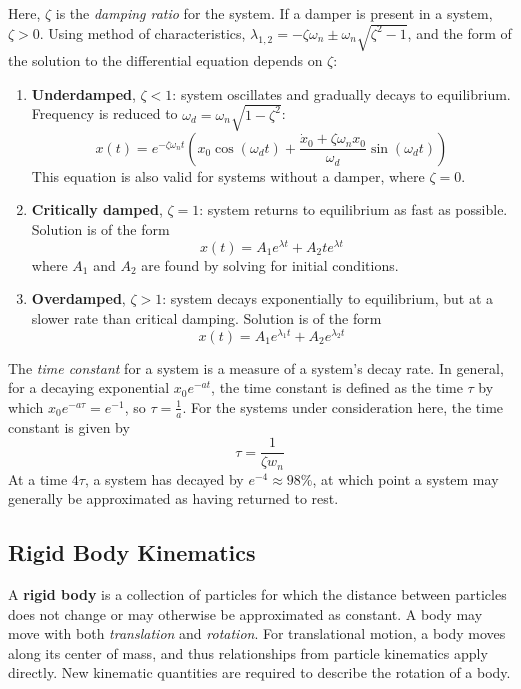 \newpage

Here, $\zeta$ is the \textit{damping ratio} for the system. If a damper is present in a system, $\zeta > 0$. Using method of characteristics, $\lambda_{1,2} = -\zeta\omega_n \pm \omega_n\sqrt{\zeta^2-1}$, and the form of the solution to the differential equation depends on $\zeta$:

\begin{enumerate}
    \item[] \textbf{Underdamped}, $\zeta < 1$: system oscillates and gradually decays to equilibrium. Frequency is reduced to $\omega_d = \omega_n \sqrt{1-\zeta^2}$: \[x(t) = e^{-\zeta\omega_nt}\left(x_0\cos(\omega_d t)+\frac{\dot x_0+\zeta\omega_nx_0}{\omega_d}\sin(\omega_d t)\right)\]
    This equation is also valid for systems without a damper, where $\zeta=0$.
    \item[] \textbf{Critically damped}, $\zeta = 1$: system returns to equilibrium as fast as possible. Solution is of the form \[x(t) = A_1e^{\lambda t} + A_2te^{\lambda t}\] where $A_1$ and $A_2$ are found by solving for initial conditions.
    \item[] \textbf{Overdamped}, $\zeta > 1$: system decays exponentially to equilibrium, but at a slower rate than critical damping. Solution is of the form \[x(t) = A_1e^{\lambda_1 t}+A_2e^{\lambda_2 t}\]
\end{enumerate}

The \textit{time constant} for a system is a measure of a system's decay rate. In general, for a decaying exponential $x_0e^{-at}$, the time constant is defined as the time $\tau$ by which $x_0 e^{-a\tau} = e^{-1}$, so $\tau = \frac{1}{a}$. For the systems under consideration here, the time constant is given by \[\tau = \frac{1}{\zeta w_n}\] At a time $4\tau$, a system has decayed by $e^{-4}\approx 98\%$, at which point a system may generally be approximated as having returned to rest.

\subsection{Rigid Body Kinematics} %

A \textbf{rigid body} is a collection of particles for which the distance between particles does not change or may otherwise be approximated as constant. A body may move with both \textit{translation} and \textit{rotation}. For translational motion, a body moves along its center of mass, and thus relationships from particle kinematics apply directly. New kinematic quantities are required to describe the rotation of a body.

